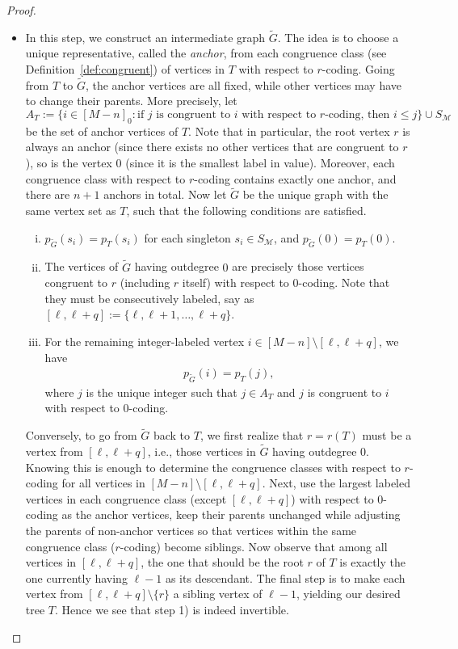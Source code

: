 \documentclass[11pt,reqno]{amsart}
\numberwithin{equation}{section}
\theoremstyle{plain}
\theoremstyle{definition}
\newcommand{\M}{\mathcal{M}}
\begin{document}
\begin{proof}
\begin{itemize}
	\item[Step 1)] In this step, we construct an intermediate graph $\tilde{G}$. The idea is to choose a unique representative, called the {\em anchor}, from each congruence class (see Definition~\ref{def:congruent}) of vertices in $T$ with respect to $r$-coding. Going from $T$ to $\tilde{G}$, the anchor vertices are all fixed, while other vertices may have to change their parents. More precisely, let
	$$A_T:=\{i\in[M-n]_0: \text{if $j$ is congruent to $i$ with respect to $r$-coding, then $i\le j$}\}\cup S_{\M}$$
	be the set of anchor vertices of $T$. Note that in particular, the root vertex $r$ is always an anchor (since there exists no other vertices that are congruent to $r$), so is the vertex $0$ (since it is the smallest label in value). Moreover, each congruence class with respect to $r$-coding contains exactly one anchor, and there are $n+1$ anchors in total. Now let $\tilde{G}$ be the unique graph with the same vertex set as $T$, such that the following conditions are satisfied.
	\begin{enumerate}[(i)]
	\item $p_{\tilde{G}}(s_i)=p_T(s_i)$ for each singleton $s_i\in S_{\M}$, and $p_{\tilde{G}}(0)=p_T(0)$.
	\item The vertices of $\tilde{G}$ having outdegree $0$ are precisely those vertices congruent to $r$ (including $r$ itself) with respect to $0$-coding. Note that they must be consecutively labeled, say as $[\ell,\ell+q]:=\{\ell,\ell+1,\ldots,\ell+q\}$.
	\item For the remaining integer-labeled vertex $i\in[M-n]\setminus [\ell,\ell+q]$, we have
	\begin{align*} 
	p_{\tilde{G}}(i)=p_T(j),
	\end{align*}
	where $j$ is the unique integer such that $j\in A_T$ and $j$ is congruent to $i$ with respect to $0$-coding. 
	\end{enumerate}
	Conversely, to go from $\tilde{G}$ back to $T$, we first realize that $r=r(T)$ must be a vertex from $[\ell,\ell+q]$, i.e., those vertices in $\tilde{G}$ having outdegree $0$. Knowing this is enough to determine the congruence classes with respect to $r$-coding for all vertices in $[M-n]\setminus [\ell,\ell+q]$. Next, use the largest labeled vertices in each congruence class (except $[\ell,\ell+q]$) with respect to $0$-coding as the anchor vertices, keep their parents unchanged while adjusting the parents of non-anchor vertices so that vertices within the same congruence class ($r$-coding) become siblings. Now observe that among all vertices in $[\ell,\ell+q]$, the one that should be the root $r$ of $T$ is exactly the one currently having $\ell-1$ as its descendant. The final step is to make each vertex from $[\ell,\ell+q]\setminus\{r\}$ a sibling vertex of $\ell-1$, yielding our desired tree $T$. Hence we see that step 1) is indeed invertible.

\end{itemize}
\end{proof}
\end{document}
